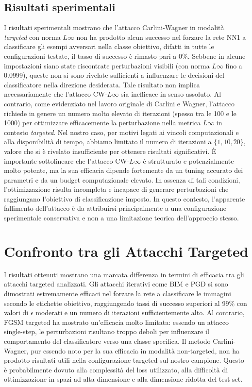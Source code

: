         \subsection{Risultati sperimentali}
            I risultati sperimentali mostrano che l’attacco Carlini-Wagner in modalità \textit{targeted} con norma $L\infty$ non ha prodotto alcun successo nel forzare la rete NN1 a classificare gli esempi avversari nella classe obiettivo, difatti in tutte le configurazioni testate, il tasso di successo è rimasto pari a $0\%$. Sebbene in alcune impostazioni siano state riscontrate perturbazioni visibili (con norma $L\infty$ fino a 0.0999), queste non si sono rivelate sufficienti a influenzare le decisioni del classificatore nella direzione desiderata.
            Tale risultato non implica necessariamente che l’attacco CW-$L\infty$ sia inefficace in senso assoluto. Al contrario, come evidenziato nel lavoro originale di Carlini e Wagner, l’attacco richiede in genere un numero molto elevato di iterazioni (spesso tra le 100 e le 1000) per ottimizzare efficacemente la perturbazione nella metrica $L\infty$ in contesto \textit{targeted}. Nel nostro caso, per motivi legati ai vincoli computazionali e alla disponibilità di tempo, abbiamo limitato il numero di iterazioni a $\{1, 10, 20\}$, valore che si è rivelato insufficiente per ottenere risultati significativi.
            È importante sottolineare che l’attacco CW-$L\infty$ è strutturato e potenzialmente molto potente, ma la sua efficacia dipende fortemente da un tuning accurato dei parametri e da un budget computazionale elevato. In assenza di tali condizioni, l’ottimizzazione risulta incompleta e incapace di generare perturbazioni che raggiungano l’obiettivo di classificazione imposto. In questo contesto, l'apparente fallimento dell'attacco è da attribuirsi principalmente a una configurazione sperimentale conservativa e non a una limitazione teorica dell'approccio stesso.
            
    \section{Confronto tra gli Attacchi Targeted}
        I risultati ottenuti mostrano una marcata differenza in termini di efficacia tra gli attacchi targeted analizzati. Gli attacchi iterativi come BIM e PGD si sono dimostrati estremamente efficaci nel forzare la rete a classificare le immagini secondo le etichette obiettivo, raggiungendo tassi di successo superiori al 99\% con valori di $\epsilon$ moderati e un numero di iterazioni sufficientemente alto.
        Al contrario, FGSM targeted ha mostrato un'efficacia molto limitata: essendo un attacco single-step, le perturbazioni risultano troppo deboli per influenzare il comportamento del classificatore verso una classe specifica.
        Il metodo Carlini-Wagner, pur essendo noto per la sua efficacia in modalità non-targeted, non ha prodotto risultati utili nella configurazione targeted sul nostro campione. Questo è probabilmente dovuto alla complessità del loss utilizzato, alla difficoltà di ottimizzazione in spazi ad alta dimensione e alla dimensione ridotta del test set.